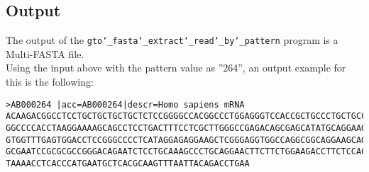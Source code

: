 \subsection*{Output}
The output of the \texttt{gto\char`_fasta\char`_extract\char`_read\char`_by\char`_pattern} program is a Multi-FASTA file.\\
Using the input above with the pattern value as ''264'', an output example for this is the following:
\begin{lstlisting}
>AB000264 |acc=AB000264|descr=Homo sapiens mRNA 
ACAAGACGGCCTCCTGCTGCTGCTGCTCTCCGGGGCCACGGCCCTGGAGGGTCCACCGCTGCCCTGCTGCCATTGTCCCC
GGCCCCACCTAAGGAAAAGCAGCCTCCTGACTTTCCTCGCTTGGGCCGAGACAGCGAGCATATGCAGGAAGCGGCAGGAA
GTGGTTTGAGTGGACCTCCGGGCCCCTCATAGGAGAGGAAGCTCGGGAGGTGGCCAGGCGGCAGGAAGCAGGCCAGTGCC
GCGAATCCGCGCGCCGGGACAGAATCTCCTGCAAAGCCCTGCAGGAACTTCTTCTGGAAGACCTTCTCCACCCCCCCAGC
TAAAACCTCACCCATGAATGCTCACGCAAGTTTAATTACAGACCTGAA
\end{lstlisting}

